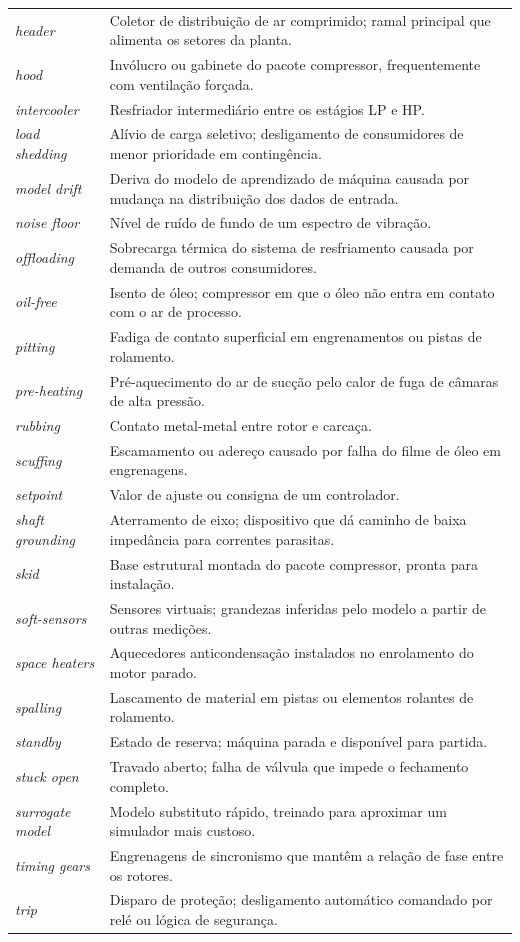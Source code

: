 \documentclass[12pt,a4paper]{article}
\numberwithin{equation}{section}
\numberwithin{table}{section}
\numberwithin{figure}{section}
\begin{document}
{\begin{longtable}{p{4.0cm} p{10.0cm}}
\textit{header} & Coletor de distribuição de ar comprimido; ramal principal que alimenta os setores da planta. \\
\textit{hood} & Invólucro ou gabinete do pacote compressor, frequentemente com ventilação forçada. \\
\textit{intercooler} & Resfriador intermediário entre os estágios LP e HP. \\
\textit{load shedding} & Alívio de carga seletivo; desligamento de consumidores de menor prioridade em contingência. \\
\textit{model drift} & Deriva do modelo de aprendizado de máquina causada por mudança na distribuição dos dados de entrada. \\
\textit{noise floor} & Nível de ruído de fundo de um espectro de vibração. \\
\textit{offloading} & Sobrecarga térmica do sistema de resfriamento causada por demanda de outros consumidores. \\
\textit{oil-free} & Isento de óleo; compressor em que o óleo não entra em contato com o ar de processo. \\
\textit{pitting} & Fadiga de contato superficial em engrenamentos ou pistas de rolamento. \\
\textit{pre-heating} & Pré-aquecimento do ar de sucção pelo calor de fuga de câmaras de alta pressão. \\
\textit{rubbing} & Contato metal-metal entre rotor e carcaça. \\
\textit{scuffing} & Escamamento ou adereço causado por falha do filme de óleo em engrenagens. \\
\textit{setpoint} & Valor de ajuste ou consigna de um controlador. \\
\textit{shaft grounding} & Aterramento de eixo; dispositivo que dá caminho de baixa impedância para correntes parasitas. \\
\textit{skid} & Base estrutural montada do pacote compressor, pronta para instalação. \\
\textit{soft-sensors} & Sensores virtuais; grandezas inferidas pelo modelo a partir de outras medições. \\
\textit{space heaters} & Aquecedores anticondensação instalados no enrolamento do motor parado. \\
\textit{spalling} & Lascamento de material em pistas ou elementos rolantes de rolamento. \\
\textit{standby} & Estado de reserva; máquina parada e disponível para partida. \\
\textit{stuck open} & Travado aberto; falha de válvula que impede o fechamento completo. \\
\textit{surrogate model} & Modelo substituto rápido, treinado para aproximar um simulador mais custoso. \\
\textit{timing gears} & Engrenagens de sincronismo que mantêm a relação de fase entre os rotores. \\
\textit{trip} & Disparo de proteção; desligamento automático comandado por relé ou lógica de segurança. \\
\bottomrule
\end{longtable}

}
\end{document}
